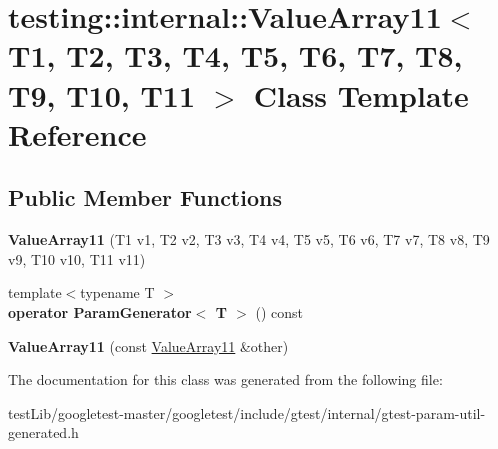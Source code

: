 \hypertarget{classtesting_1_1internal_1_1ValueArray11}{}\section{testing\+:\+:internal\+:\+:Value\+Array11$<$ T1, T2, T3, T4, T5, T6, T7, T8, T9, T10, T11 $>$ Class Template Reference}
\label{classtesting_1_1internal_1_1ValueArray11}
\subsection*{Public Member Functions}
\begin{DoxyCompactItemize}
\item 
\mbox{\label{classtesting_1_1internal_1_1ValueArray11_a2b26f49e7c5856e86f4fae360cd22d47}} 
{\bfseries Value\+Array11} (T1 v1, T2 v2, T3 v3, T4 v4, T5 v5, T6 v6, T7 v7, T8 v8, T9 v9, T10 v10, T11 v11)
\item 
\mbox{\label{classtesting_1_1internal_1_1ValueArray11_a3042498fcde8d1c91df474e618416f28}} 
{\footnotesize template$<$typename T $>$ }\\{\bfseries operator Param\+Generator$<$ T $>$} () const
\item 
\mbox{\label{classtesting_1_1internal_1_1ValueArray11_a09b4890b05313d04d98cbb5507d9b34e}} 
{\bfseries Value\+Array11} (const \hyperlink{classtesting_1_1internal_1_1ValueArray11}{Value\+Array11} \&other)
\end{DoxyCompactItemize}


The documentation for this class was generated from the following file\+:\begin{DoxyCompactItemize}
\item 
test\+Lib/googletest-\/master/googletest/include/gtest/internal/gtest-\/param-\/util-\/generated.\+h\end{DoxyCompactItemize}
